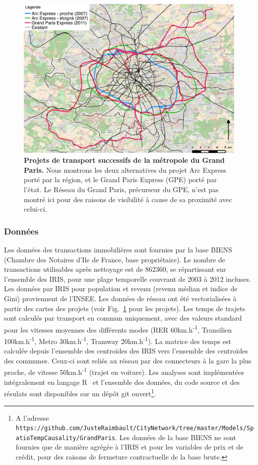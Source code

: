 \documentclass[french]{./sageo}
\begin{document}
\begin{figure}[h]
\centering
\includegraphics[width=12cm]{figures/reseaux}
\caption{\textbf{Projets de transport successifs de la métropole du Grand Paris.} Nous montrons les deux alternatives du projet Arc Express porté par la région, et le Grand Paris Express (GPE) porté par l'état. Le Réseau du Grand Paris, précurseur du GPE, n'est pas montré ici pour des raisons de visibilité à cause de sa proximité avec celui-ci.}
\label{fig:projects}
\end{figure}

\subsubsection{Données}

Les données des transactions immobilières sont fournies par la base BIENS (Chambre des Notaires d'Ile de France, base propriétaire). Le nombre de transactions utilisables après nettoyage est de 862360, se répartissant sur l'ensemble des IRIS, pour une plage temporelle couvrant de 2003 à 2012 incluses. Les données par IRIS pour population et revenu (revenu médian et indice de Gini) proviennent de l'INSEE. Les données de réseau ont été vectorialisées à partir des cartes des projets (voir Fig.~\ref{fig:projects} pour les projets). Les temps de trajets sont calculés par transport en commun uniquement, avec des valeurs standard pour les vitesses moyennes des différents modes (RER 60km.h\textsuperscript{-1}, Transilien 100km.h\textsuperscript{-1}, Metro 30km.h\textsuperscript{-1}, Tramway 20km.h\textsuperscript{-1}). La matrice des temps est calculée depuis l'ensemble des centroïdes des IRIS vers l'ensemble des centroïdes des communes. Ceux-ci sont reliés au réseau par des connecteurs à la gare la plus proche, de vitesse 50km.h\textsuperscript{-1} (trajet en voiture). Les analyses sont implémentées intégralement en langage R~\cite{rcoreteam} et l'ensemble des données, du code source et des résulats sont disponibles sur un dépôt git ouvert\footnote{A l'adresse\\\texttt{https://github.com/JusteRaimbault/CityNetwork/tree/master/Models/SpatioTempCausality/GrandParis}. Les données de la base BIENS ne sont fournies que de manière agrégée à l'IRIS et pour les variables de prix et de crédit, pour des raisons de fermeture contractuelle de la base brute.}.
\end{document}
